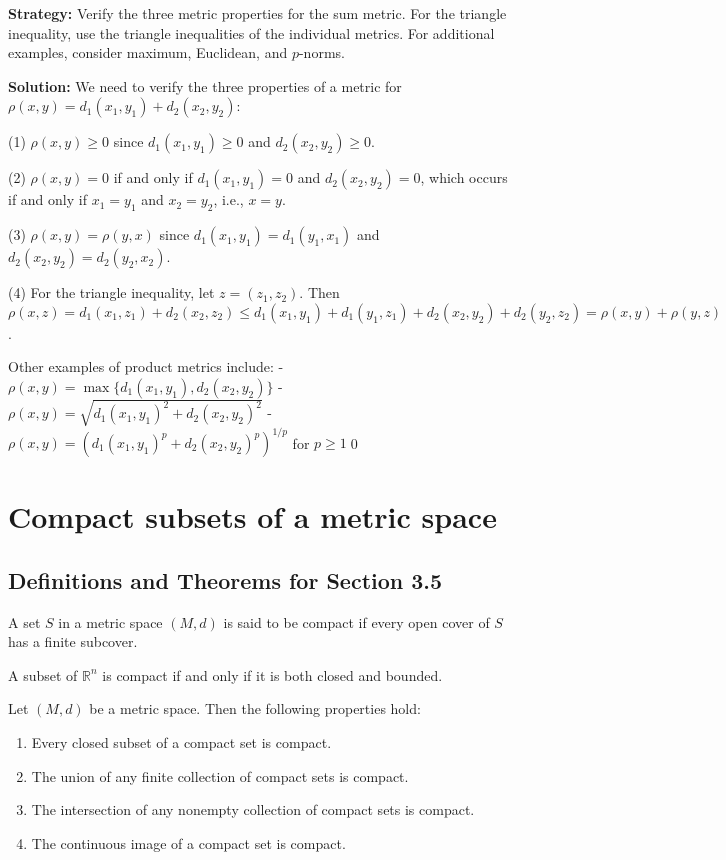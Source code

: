 \noindent\textbf{Strategy:} Verify the three metric properties for the sum metric. For the triangle inequality, use the triangle inequalities of the individual metrics. For additional examples, consider maximum, Euclidean, and $p$-norms.

\bigskip\noindent\textbf{Solution:} We need to verify the three properties of a metric for $\rho(x,y) = d_1(x_1,y_1) + d_2(x_2,y_2)$:

(1) $\rho(x,y) \geq 0$ since $d_1(x_1,y_1) \geq 0$ and $d_2(x_2,y_2) \geq 0$.

(2) $\rho(x,y) = 0$ if and only if $d_1(x_1,y_1) = 0$ and $d_2(x_2,y_2) = 0$, which occurs if and only if $x_1 = y_1$ and $x_2 = y_2$, i.e., $x = y$.

(3) $\rho(x,y) = \rho(y,x)$ since $d_1(x_1,y_1) = d_1(y_1,x_1)$ and $d_2(x_2,y_2) = d_2(y_2,x_2)$.

(4) For the triangle inequality, let $z = (z_1,z_2)$. Then $\rho(x,z) = d_1(x_1,z_1) + d_2(x_2,z_2) \leq d_1(x_1,y_1) + d_1(y_1,z_1) + d_2(x_2,y_2) + d_2(y_2,z_2) = \rho(x,y) + \rho(y,z)$.

Other examples of product metrics include:
- $\rho(x,y) = \max\{d_1(x_1,y_1), d_2(x_2,y_2)\}$
- $\rho(x,y) = \sqrt{d_1(x_1,y_1)^2 + d_2(x_2,y_2)^2}$
- $\rho(x,y) = (d_1(x_1,y_1)^p + d_2(x_2,y_2)^p)^{1/p}$ for $p \geq 1$\qed
\section{Compact subsets of a metric space}

\subsection*{Definitions and Theorems for Section 3.5}

\begin{definition}
A set $S$ in a metric space $(M,d)$ is said to be compact if every open cover of $S$ has a finite subcover.
\end{definition}

\begin{theorem}
A subset of $\mathbb{R}^n$ is compact if and only if it is both closed and bounded.
\end{theorem}

\begin{theorem}
Let $(M,d)$ be a metric space. Then the following properties hold:
\begin{enumerate}
\item Every closed subset of a compact set is compact.
\item The union of any finite collection of compact sets is compact.
\item The intersection of any nonempty collection of compact sets is compact.
\item The continuous image of a compact set is compact.
\end{enumerate}
\end{theorem}

